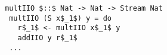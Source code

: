 \begin{figure}[!t]
  \centering
  \begin{minipage}{0.8\columnwidth}
    \begin{lstlisting}[frame=tb]
 multIIO $::$ Nat -> Nat -> Stream Nat
 multIIO (S x$_1$) y = do
   r$_1$ <- multIIO x$_1$ y
   addIIO y r$_1$
 ...
    \end{lstlisting}
  \end{minipage}
\end{figure}

